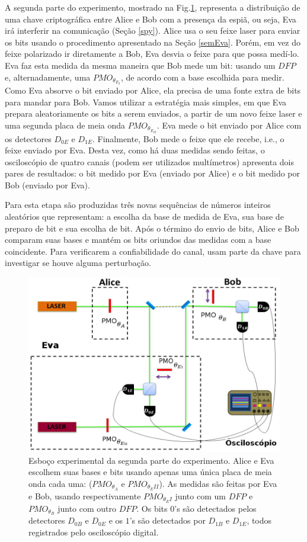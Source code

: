 \documentclass[pra, twocolumn]{revtex4}
\begin{document}
A segunda parte do experimento, mostrado na Fig.\ref{exp2}, representa a distribui\c c\~ao de uma chave criptogr\'afica entre Alice e Bob com a presen\c ca da espi\~a, ou seja, Eva ir\'a interferir na comunica\c c\~ao (Se\c c\~ao \ref{spy}). Alice usa o seu feixe laser para enviar os bits usando o procedimento apresentado na Se\c c\~ao \ref{semEva}. Por\'em, em vez do feixe polarizado ir diretamente a Bob, Eva desvia o feixe para que possa med\'i-lo. Eva faz esta medida da mesma maneira que Bob mede um bit:  usando um $DFP$ e, alternadamente, uma $PMO_{\theta_{E_I}}$, de acordo com a base escolhida para medir. Como Eva absorve o bit enviado por Alice, ela precisa de uma fonte extra de bits para mandar para Bob. Vamos utilizar a estrat\'egia mais simples, em que Eva prepara aleatoriamente os bits a serem enviados, a partir de um novo feixe laser e uma segunda placa de meia onda $PMO_{\theta_{E_{II}}}$. Eva mede o bit enviado por Alice com os detectores $D_{0E}$ e $D_{1E}$. Finalmente, Bob mede o feixe que ele recebe, i.e., o feixe enviado por Eva. Desta vez, como h\'a duas medidas sendo feitas, o oscilosc\'opio de quatro canais (podem ser utilizados mult\'imetros) apresenta dois pares de resultados: o bit medido por Eva (enviado por Alice) e o bit medido por Bob (enviado por Eva).

Para esta etapa s\~ao produzidas tr\^es novas sequ\^encias de n\'umeros inteiros aleat\'orios que representam: a escolha da base de medida de Eva, sua base de preparo de bit e sua escolha de bit. Ap\'os o t\'ermino do envio de bits, Alice e Bob comparam suas bases e mant\'em os bits oriundos das medidas com a base coincidente. Para verificarem a confiabilidade do canal, usam parte da chave para investigar se houve alguma perturba\c c\~ao.


\begin{figure} [H]
     \centering
     \includegraphics[scale=0.55, trim=0cm 1cm 1cm 0cm, clip=true,width =8.5 cm, height=5 cm]{fig3.jpg}
     \caption[Esbo\c co experimental da segunda parte do experimento, sem espionagem.]{Esbo\c co experimental da segunda parte do experimento. Alice e Eva escolhem suas bases e bits usando apenas uma \'unica placa de meia onda cada uma: ($PMO_{\theta_A}$ e $PMO_{\theta_E II}$). As medidas s\~ao feitas por Eva e Bob, usando respectivamente $PMO_{\theta_EI}$ junto com um $DFP$ e $PMO_{\theta_B}$ junto com outro $DFP$. Os bits $0$'s s\~ao detectados pelos detectores $D_{0B}$ e $D_{0E}$ e os $1$'s s\~ao detectados por $D_{1B}$ e $D_{1E}$, todos registrados pelo oscilosc\'opio digital.}
     \label{exp2}
\end{figure}
\end{document}
